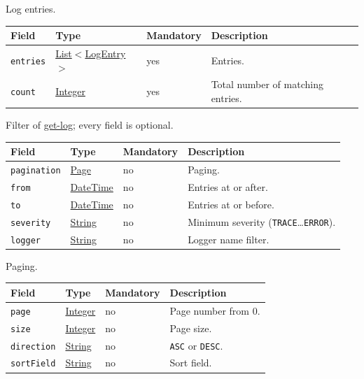 \documentclass[a4paper]{arrowhead}
\newcommand{\mref}[1]{{\textcolor{ArrowheadPurple}{\hyperref[sec:model:#1]{#1}}}}
\newcommand{\oref}[1]{{\textcolor{ArrowheadBlue}{\hyperref[sec:operations:#1]{#1}}}}
\newcommand{\pref}[1]{{\textcolor{ArrowheadGrey}{\hyperref[sec:model:primitives:#1]{#1}}}}
\begin{document}
Log entries.

{\small
\begin{longtable}{|p{3.7cm}|p{4.2cm}|p{1.6cm}|p{6.3cm}|}

\hline
\rowcolor{gray!33} Field & Type & Mandatory & Description \\ \hline
\endhead
\texttt{entries} & \pref{List}$<$\mref{LogEntry}$>$ & yes & Entries. \\ \hline
\texttt{count} & \pref{Integer} & yes & Total number of matching entries. \\ \hline
\end{longtable}
}

Filter of \oref{get-log}; every field is optional.

{\small
\begin{longtable}{|p{3.7cm}|p{4.2cm}|p{1.6cm}|p{6.3cm}|}

\hline
\rowcolor{gray!33} Field & Type & Mandatory & Description \\ \hline
\endhead
\texttt{pagination} & \mref{Page} & no & Paging. \\ \hline
\texttt{from} & \pref{DateTime} & no & Entries at or after. \\ \hline
\texttt{to} & \pref{DateTime} & no & Entries at or before. \\ \hline
\texttt{severity} & \pref{String} & no & Minimum severity (\texttt{TRACE}\ldots\texttt{ERROR}). \\ \hline
\texttt{logger} & \pref{String} & no & Logger name filter. \\ \hline
\end{longtable}
}

Paging.

{\small
\begin{longtable}{|p{3.7cm}|p{4.2cm}|p{1.6cm}|p{6.3cm}|}

\hline
\rowcolor{gray!33} Field & Type & Mandatory & Description \\ \hline
\endhead
\texttt{page} & \pref{Integer} & no & Page number from 0. \\ \hline
\texttt{size} & \pref{Integer} & no & Page size. \\ \hline
\texttt{direction} & \pref{String} & no & \texttt{ASC} or \texttt{DESC}. \\ \hline
\texttt{sortField} & \pref{String} & no & Sort field. \\ \hline
\end{longtable}
}
\end{document}
